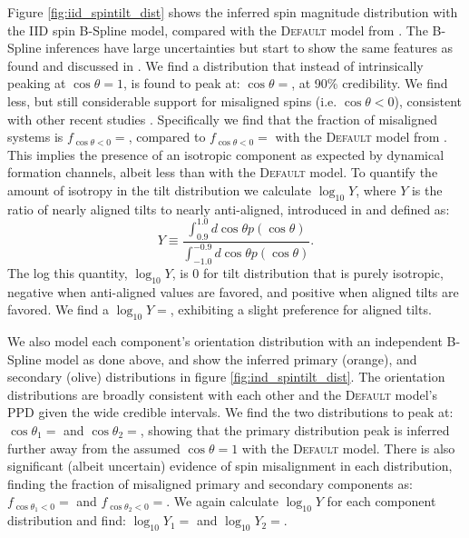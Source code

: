 Figure \ref{fig:iid_spintilt_dist} shows the inferred spin magnitude distribution with the IID spin B-Spline model, compared with the \textsc{Default} model from \citet{o3b_astro_dist}. 
The B-Spline inferences have large uncertainties but start to show the same features as found and discussed in \citet{spinitasyoulike}. 
We find a distribution that instead of intrinsically peaking at $\cos{\theta}=1$, is found to peak at: $\cos{\theta}=$\result{$\CIPlusMinus{\macros[BSplineIIDCompSpins][peakCosTilt]}$}, at 
90\% credibility. We find less, but still considerable support for misaligned spins (i.e. $\cos{\theta}<0$), consistent with other recent studies \citep{o3a_pop,o3b_astro_dist,Callister_NoEvidence}. Specifically we 
find that the fraction of misaligned systems is $f_{\cos{\theta}<0}=$\result{$\CIPlusMinus{\macros[BSplineIIDCompSpins][negFrac]}$}, compared to 
$f_{\cos{\theta}<0}=$\result{$\CIPlusMinus{\macros[Default][negFrac]}$} with the \textsc{Default} model from \citet{o3b_astro_dist}. This implies 
the presence of an isotropic component as expected by dynamical formation channels, albeit less than with the \textsc{Default} model. To quantify the 
amount of isotropy in the tilt distribution we calculate $\log_{10}Y$, where $Y$ is the ratio of nearly aligned tilts to nearly anti-aligned, 
introduced in \citet{spinitasyoulike} and defined as:
\begin{equation}
    Y \equiv \frac{\int_{0.9}^{1.0} d\cos{\theta} p(\cos{\theta})}{\int_{-1.0}^{-0.9} d\cos{\theta} p(\cos{\theta})}.
\end{equation}
The log this quantity, $\log_{10}Y$, is 0 for tilt distribution that is purely isotropic, negative when anti-aligned values are favored, 
and positive when aligned tilts are favored. We find a $\log_{10}Y=$, exhibiting a slight preference for aligned tilts.  

We also model each component's orientation distribution with an independent B-Spline model as done above, and show the inferred 
primary (orange), and secondary (olive) distributions in figure \ref{fig:ind_spintilt_dist}. The orientation distributions are broadly
consistent with each other and the \textsc{Default} model's PPD given the wide credible intervals. We find the two distributions to peak at: $\cos{\theta_1}=$\result{$\CIPlusMinus{\macros[BSplineIndependentCompSpins][peakCosTilt1]}$} 
and $\cos{\theta_2}=$\result{$\CIPlusMinus{\macros[BSplineIndependentCompSpins][peakCosTilt2]}$}, showing that the primary distribution peak is inferred further away 
from the assumed $\cos{\theta}=1$ with the \textsc{Default} model. There is also significant (albeit uncertain) evidence of spin misalignment in each distribution, finding 
the fraction of misaligned primary and secondary components as: $f_{\cos{\theta_1}<0}=$\result{$\CIPlusMinus{\macros[BSplineIndependentCompSpins][negFrac1]}$} and 
$f_{\cos{\theta_2}<0}=$\result{$\CIPlusMinus{\macros[BSplineIndependentCompSpins][negFrac2]}$}. We again calculate $\log_{10}Y$  
for each component distribution and find: $\log_{10}Y_1=$ and 
$\log_{10}Y_2=$.

